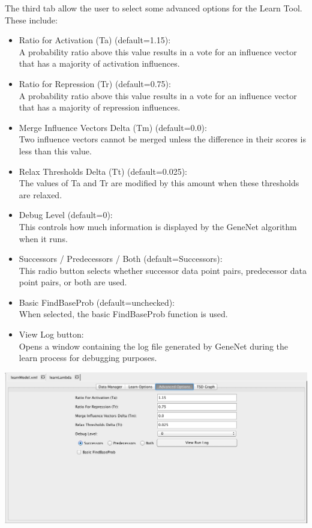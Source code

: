 \documentclass[titlepage,11pt]{article}
\begin{document}
The third tab allow the user to select some advanced options for the Learn Tool.  These include:
\begin{itemize}
\item Ratio for Activation (Ta) (default=1.15): \\
A probability ratio above this value results in a vote for an influence vector that has a majority of activation influences.
\item Ratio for Repression (Tr) (default=0.75): \\
A probability ratio above this value results in a vote for an influence vector that has a majority of repression influences.
\item Merge Influence Vectors Delta (Tm) (default=0.0): \\
Two influence vectors cannot be merged unless the difference in their scores is less than this value.
\item Relax Thresholds Delta (Tt) (default=0.025): \\
The values of Ta and Tr are modified by this amount when these thresholds are relaxed.
\item Debug Level (default=0): \\
This controls how much information is displayed by the GeneNet algorithm when it runs.
\item Successors / Predecessors / Both (default=Successors): \\
This radio button selects whether successor data point pairs, predecessor data point pairs, or both are used.
\item Basic FindBaseProb (default=unchecked): \\
When selected, the basic FindBaseProb function is used.
\item View Log button:\\
Opens a window containing the log file generated by GeneNet during the learn process for debugging purposes.  
\end{itemize}

\begin{center}
\includegraphics[width=160mm]{screenshots/advLearn}
\end{center}
\end{document}
